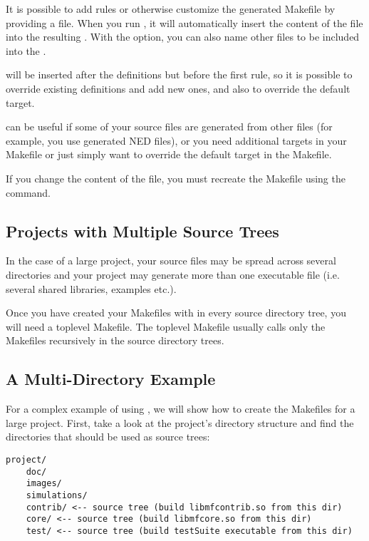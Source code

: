 It is possible to add rules or otherwise customize the generated Makefile
by providing a  file. When you run , it
will automatically insert the content of the  file into the
resulting . With the  option, you can also name other
files to be included into the .

 will be inserted after the definitions but before the first
rule, so it is possible to override existing definitions and add new
ones, and also to override the default target.

 can be useful if some of your source files are generated
from other files (for example, you use generated NED files), or you need
additional targets in your Makefile or just simply want to override the
default target in the Makefile.

\begin{note}
If you change the content of the  file, you must recreate the
Makefile using the  command.
\end{note}

\subsection{Projects with Multiple Source Trees}
\label{sec:build-sim-progs:projects-with-multiple-source-trees}

In the case of a large project, your source files may be spread across
several directories and your project may generate more than one executable
file (i.e. several shared libraries, examples etc.).

Once you have created your Makefiles with  in
every source directory tree, you will need a toplevel Makefile.
The toplevel Makefile usually calls only the Makefiles
recursively in the source directory trees.


\subsection{A Multi-Directory Example}
\label{sec:build-sim-progs:multi-directory-example}

For a complex example of using , we will show how to create
the Makefiles for a large project. First, take a look at the
project's directory structure and find the directories that should be used as
source trees:

\begin{verbatim}
project/
    doc/
    images/
    simulations/
    contrib/ <-- source tree (build libmfcontrib.so from this dir)
    core/ <-- source tree (build libmfcore.so from this dir)
    test/ <-- source tree (build testSuite executable from this dir)
\end{verbatim}


